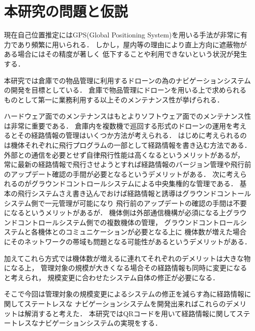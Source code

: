 \section{本研究の問題と仮説}
現在自己位置推定にはGPS(Global Positioning System)を用いる手法が非常に有力であり頻繁に用いられる．
しかし，屋内等の理由により直上方向に遮蔽物がある場合にはその精度が著しく
低下することや利用できないという状況が発生する．

本研究では倉庫での物品管理に利用するドローンの為のナビゲーションシステムの開発を目標としている．
倉庫で物品管理にドローンを用いる上で求められるものとして第一に業務利用する以上そのメンテナンス性が挙げられる．

ハードウェア面でのメンテナンスはもとよりソフトウェア面でのメンテナンス性は非常に重要である．
倉庫内を複数機で巡回する形式のドローンの運用を考えるとその経路情報の管理はいくつか方法が考えられる．
はじめに考えられるのは機体それぞれに飛行プログラムの一部として経路情報を書き込む方法である．
外部との通信を必要とせず自律飛行性能は高くなるというメリットがあるが，
常に最新の経路情報で飛行させようとすれば経路情報のバージョン管理や飛行前のアップデート確認の手間が必要となるというデメリットがある．
次に考えられるのがグラウンドコントロールシステムによる中央集権的な管理である．
基本の飛行システムさえ書き込んでおけば経路情報と誘導はグラウンドコントールシステム側で一元管理が可能になり
飛行前のアップデートの確認の手間は不要になるというメリットがあるが．
機体側は外部通信機構が必須になる上グラウンドコントロールシステム側での複数機体の管理，
グラウンドコントロールシステムと各機体とのコミュニケーションが必要となる上に
機体数が増えた場合にそのネットワークの帯域も問題となる可能性があるというデメリットがある．

加えてこれら方式では機体数が増えるに連れてそれぞれのデメリットは大きな物になる上，
管理対象の規模が大きくなる場合その経路情報も同時に変更になると考えられ，
規模変更に合わせたシステム自体の修正が必要になる．

そこで今回は管理対象の規模変更によるシステムの修正を減らす為に経路情報に関してステートレスな
ナビゲーションシステムを開発出来ればこれらのデメリットは解消すると考えた．
本研究ではQRコードを用いて経路情報に関してステートレスなナビゲーションシステムの実現をする．